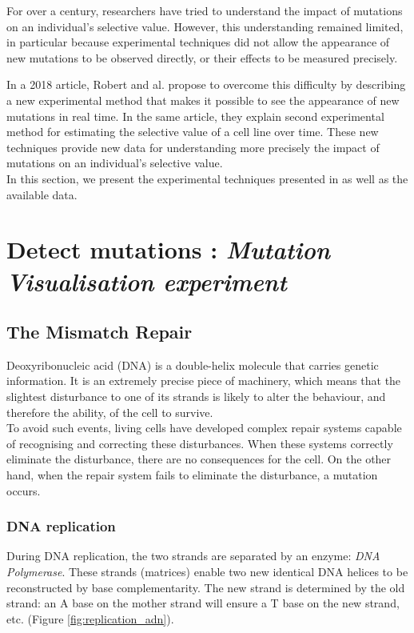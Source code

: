 For over a century, researchers have tried to understand the impact of mutations on an individual's selective value. However, this understanding remained limited, in particular because experimental techniques did not allow the appearance of new mutations to be observed directly, or their effects to be measured precisely. 

In a 2018 article, Robert and al. \cite{robert2018mutation} propose to overcome this difficulty by describing a new experimental method that makes it possible to see the appearance of new mutations in real time. In the same article, they explain second experimental method for estimating the selective value of a cell line over time.
These new techniques provide new data for understanding more precisely the impact of mutations on an individual's selective value. \\

In this section, we present the experimental techniques presented in \cite{robert2018mutation} as well as the available data.

\section{Detect mutations : \emph{Mutation Visualisation experiment}}

    \subsection{The Mismatch Repair}
    
Deoxyribonucleic acid (DNA) is a double-helix molecule that carries genetic information. It is an extremely precise piece of machinery, which means that the slightest disturbance to one of its strands is likely to alter the behaviour, and therefore the ability, of the cell to survive. \\

To avoid such events, living cells have developed complex repair systems capable of recognising and correcting these disturbances. When these systems correctly eliminate the disturbance, there are no consequences for the cell. On the other hand, when the repair system fails to eliminate the disturbance, a mutation occurs. \\

\subsubsection{DNA replication} During DNA replication, the two strands are separated by an enzyme: \emph{DNA Polymerase}. These strands (matrices) enable two new identical DNA helices to be reconstructed by base complementarity. The new strand is determined by the old strand: an A base on the mother strand will ensure a T base on the new strand, etc. (Figure \ref{fig:replication_adn}).

